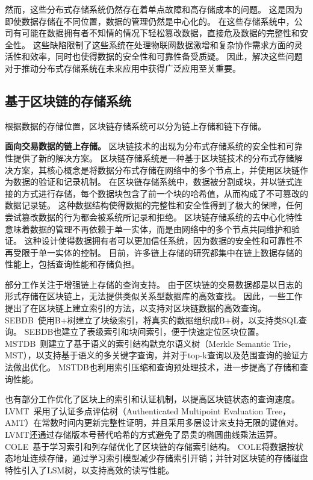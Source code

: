 然而，这些分布式存储系统仍然存在着单点故障和高存储成本的问题。
这是因为即使数据存储在不同位置，数据的管理仍然是中心化的。
在这些存储系统中，公司有可能在数据拥有者不知情的情况下轻松篡改数据，直接危及数据的完整性和安全性。
这些缺陷限制了这些系统在处理物联网数据激增和复杂协作需求方面的灵活性和效率，同时也使得数据的安全性和可靠性备受质疑。
因此，解决这些问题对于推动分布式存储系统在未来应用中获得广泛应用至关重要。

\subsection{基于区块链的存储系统}
根据数据的存储位置，区块链存储系统可以分为链上存储和链下存储。

\textbf{面向交易数据的链上存储。}
区块链技术的出现为分布式存储系统的安全性和可靠性提供了新的解决方案。
区块链存储系统是一种基于区块链技术的分布式存储解决方案，其核心概念是将数据分布式存储在网络中的多个节点上，并使用区块链作为数据的验证和记录机制。
在区块链存储系统中，数据被分割成块，并以链式连接的方式进行存储，每个数据块包含了前一个块的哈希值，从而构成了不可篡改的数据记录链。
这种数据结构使得数据的完整性和安全性得到了极大的保障，任何尝试篡改数据的行为都会被系统所记录和拒绝。
区块链存储系统的去中心化特性意味着数据的管理不再依赖于单一实体，而是由网络中的多个节点共同维护和验证。
这种设计使得数据拥有者可以更加信任系统，因为数据的安全性和可靠性不再受限于单一实体的控制。
目前，许多链上存储的研究都集中在链上数据存储的性能上，包括查询性能和存储负担。


部分工作关注于增强链上存储的查询支持。
由于区块链的交易数据都是以日志的形式存储在区块链上，无法提供类似关系型数据库的高效查找。
因此，一些工作提出了在区块链上建立索引的方法，以支持对区块链数据的高效查询。
SEBDB~\cite{zhu2019sebdb}使用B+树建立了块级索引，将真实的数据组织成B+树，以支持类SQL查询。
SEBDB也建立了表级索引和块间索引，便于快速定位区块位置。
MSTDB~\cite{zhou2022mstdb}则建立了基于语义的索引结构默克尔语义树（Merkle Semantic Trie，MST），以支持基于语义的多关键字查询，并对于top-k查询以及范围查询的验证方法做出优化。
MSTDB也利用索引压缩和查询预处理技术，进一步提高了存储和查询性能。

也有部分工作优化了区块上的索引和认证机制，以提高区块链状态的查询速度。
LVMT~\cite{li2023lvmt}采用了认证多点评估树（Authenticated Multipoint Evaluation Tree，AMT）在常数时间内更新完整性证明，并且采用多层设计来支持无限的键值对。
LVMT还通过存储版本号替代哈希的方式避免了昂贵的椭圆曲线乘法运算。
COLE~\cite{zhang2024cole}基于学习索引和列存储优化了区块链的存储索引结构。
COLE将数据按状态地址连续存储，通过学习索引模型减少存储索引开销；并针对区块链的存储磁盘特性引入了LSM树，以支持高效的读写性能。

